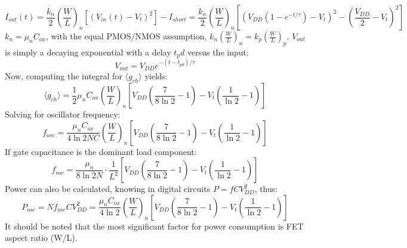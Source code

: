 \documentclass[10pt,a4paper]{article}
\begin{document}
	\begin{equation}
	I_{out}(t) = \frac{k_n}{2}\left(\frac{W}{L}\right)_n\left[\left(V_{in}(t) - V_t\right)^2 \right]  - I_{short} = \frac{k_n}{2}\left(\frac{W}{L}\right)_n\left[\left(V_{DD}\left(1-e^{-t/\tau}\right) - V_t\right)^2 - \left(\frac{V_{DD}}{2} -V_t\right)^2\right]
	\end{equation}
	$k_n = \mu_nC_{ox}$, with the equal PMOS/NMOS assumption, $k_n\left(\frac{W}{L}\right)_n=k_p\left(\frac{W}{L}\right)_p$. $V_{out}$ is simply a decaying exponential with a delay $t_pd$ versus the input:
	\begin{equation}
	V_{out} = V_{DD}e^{-(t-t_{pd})/\tau}
	\end{equation}
	Now, computing the integral for $\langle g_{ch} \rangle$ yields:
	\begin{equation}
		\langle g_{ch} \rangle = \frac{1}{2}\mu_nC_{ox}\left(\frac{W}{L}\right)_n\left[V_{DD}\left(\frac{7}{8\ln2}-1\right)-V_t\left(\frac{1}{\ln2}-1\right) \right]
	\end{equation}
	Solving for oscillator frequency:
	\begin{equation}
		f_{osc} = \frac{\mu_nC_{ox}}{4\ln2NC}\left(\frac{W}{L}\right)_n\left[V_{DD}\left(\frac{7}{8\ln2}-1\right)-V_t\left(\frac{1}{\ln2}-1\right) \right]
	\end{equation}
	If gate capacitance is the dominant load component:
	\begin{equation}
		f_{osc} = \frac{\mu_n}{8\ln2N}\cdot\frac{1}{L^2}\left[V_{DD}\left(\frac{7}{8\ln2}-1\right)-V_t\left(\frac{1}{\ln2}-1\right) \right]
	\end{equation}
	Power can also be calculated, knowing in digital circuits $P = fCV_{DD}^2$, thus:
	\begin{equation}
		P_{osc} = Nf_{osc}CV_{DD}^2 = \frac{\mu_nC_{ox}}{4\ln2}\left(\frac{W}{L}\right)_n\left[V_{DD}\left(\frac{7}{8\ln2}-1\right)-V_t\left(\frac{1}{\ln2}-1\right) \right]
	\end{equation}
	It should be noted that the most significant factor for power consumption is FET aspect ratio (W/L).
\end{document}
